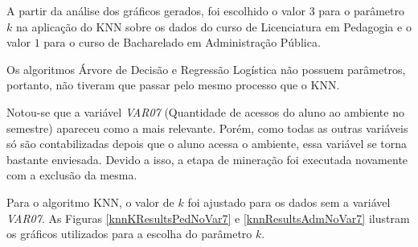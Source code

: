 A partir da análise dos gráficos gerados, foi escolhido o valor \(3\) para o
parâmetro \(k\) na aplicação do KNN sobre os dados do curso de Licenciatura em
Pedagogia e o valor \(1\) para o curso de Bacharelado em Administração Pública.

Os algoritmos Árvore de Decisão e Regressão Logística não possuem parâmetros,
portanto, não tiveram que passar pelo mesmo processo que o KNN.

Notou-se que a variável \textit{VAR07} (Quantidade de acessos do aluno ao
ambiente no semestre) apareceu como a mais relevante. Porém, como todas as
outras variáveis só são contabilizadas depois que o aluno acessa o ambiente,
essa variável se torna bastante enviesada. Devido a isso, a etapa de mineração
foi executada novamente com a exclusão da mesma.

Para o algoritmo KNN, o valor de \(k\) foi ajustado para os dados sem a variável
\textit{VAR07}. As Figuras \ref{knnKResultsPedNoVar7} e
\ref{knnResultsAdmNoVar7} ilustram os gráficos utilizados para a escolha do
parâmetro \(k\).

